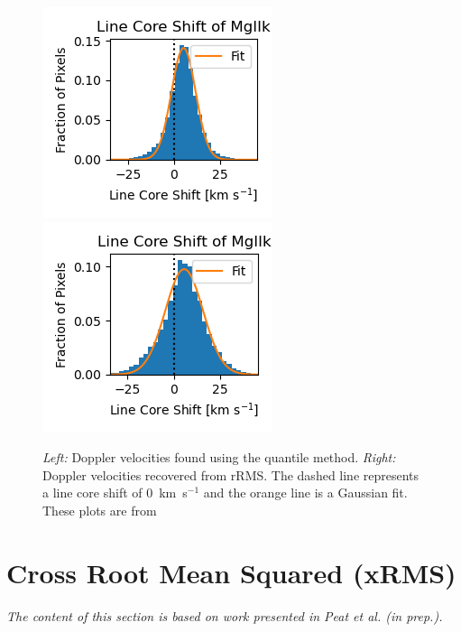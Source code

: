 \begin{figure}
    \includegraphics*[width=0.3\linewidth]{./02Modelling1D/figs/20180419/kvelocities.png}
    \hspace{1cm}
    \includegraphics*[width=0.3\linewidth]{./02Modelling1D/figs/20180419/kvelocitiesfound.png}
    \caption[Doppler velocities found using the quantile method and Doppler velocities recovered from rRMS.]{\textit{Left:} Doppler velocities found using the quantile method. \textit{Right:} Doppler velocities recovered from rRMS. The dashed line represents a line core shift of 0~km~s$^{-1}$ and the orange line is a Gaussian fit. These plots are from \cite{peat_solar_2021}}
    \label{vels}
\end{figure}
\newpage
\section{Cross Root Mean Squared (xRMS)}
\label{xrms}
\textit{The content of this section is based on work presented in Peat et al. (in prep.).}

